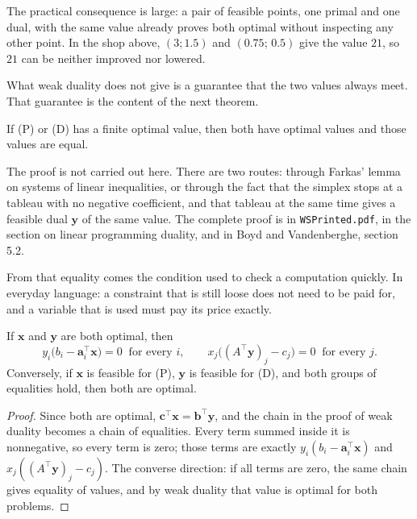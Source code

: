 The practical consequence is large: a pair of feasible points, one primal and one dual, with
the same value already proves both optimal without inspecting any other point. In the shop
above, $(3;1.5)$ and $(0.75;\,0.5)$ give the value $21$, so $21$ can be neither improved nor
lowered.

What weak duality does not give is a guarantee that the two values always meet. That guarantee
is the content of the next theorem.

\begin{teorema}
If (P) or (D) has a finite optimal value, then both have optimal values and those values are
equal.
\end{teorema}

The proof is not carried out here. There are two routes: through Farkas' lemma on systems of
linear inequalities, or through the fact that the simplex stops at a tableau with no negative
coefficient, and that tableau at the same time gives a feasible dual $\mathbf{y}$ of the same
value. The complete proof is in \texttt{WSPrinted.pdf}, in the section on linear programming
duality, and in Boyd and Vandenberghe, section 5.2.

From that equality comes the condition used to check a computation quickly. In everyday
language: a constraint that is still loose does not need to be paid for, and a variable that is
used must pay its price exactly.

\begin{akibat}
If $\mathbf{x}$ and $\mathbf{y}$ are both optimal, then
\[
  y_{i}\bigl(b_{i}-\mathbf{a}_{i}^{\top}\mathbf{x}\bigr)=0 \ \text{ for every } i,
  \qquad
  x_{j}\bigl((A^{\top}\mathbf{y})_{j}-c_{j}\bigr)=0 \ \text{ for every } j .
\]
Conversely, if $\mathbf{x}$ is feasible for (P), $\mathbf{y}$ is feasible for (D), and both
groups of equalities hold, then both are optimal.
\end{akibat}

\begin{proof}
Since both are optimal, $\mathbf{c}^{\top}\mathbf{x}=\mathbf{b}^{\top}\mathbf{y}$, and the
chain in the proof of weak duality becomes a chain of equalities. Every term summed inside it is
nonnegative, so every term is zero; those terms are exactly
$y_{i}(b_{i}-\mathbf{a}_{i}^{\top}\mathbf{x})$ and
$x_{j}((A^{\top}\mathbf{y})_{j}-c_{j})$. The converse direction: if all terms are zero, the same
chain gives equality of values, and by weak duality that value is optimal for both problems.
\end{proof}

